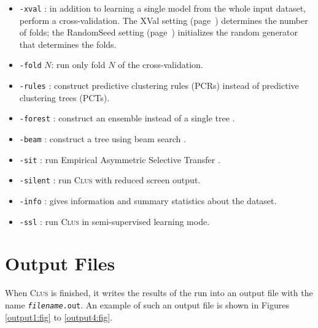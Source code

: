 \documentclass[a4paper]{report}
\newcommand{\clus}{\textsc{Clus}}
\begin{document}
\begin{itemize}
\item {\tt -xval} : in addition to learning a single model from the whole input dataset, perform a cross-validation.  The XVal setting (page~\pageref{sett:xval}) determines the number of folds; the RandomSeed setting (page~\pageref{sett:seed}) initializes the random generator that determines the folds.

\item {\tt -fold} $N$: run only fold $N$ of the cross-validation.

\item {\tt -rules} : construct predictive clustering rules (PCRs) instead of predictive clustering trees (PCTs).

\item {\tt -forest} : construct an ensemble instead of a single tree \cite{Kocev07b:proc}.

\item {\tt -beam} : construct a tree using beam search \cite{Kocev07a:proc}.

\item {\tt -sit} : run Empirical Asymmetric Selective Transfer \cite{Piccart08-DS:proc}.

\item {\tt -silent} : run \clus{} with reduced screen output.

\item {\tt -info} : gives information and summary statistics about the dataset.

\item {\tt -ssl} : run \clus{} in semi-supervised learning mode.
\end{itemize}


\chapter{Output Files}
\label{ch:output}

When \clus{} is finished, it writes the results of the run into an output file with the name
{\tt {\em filename}.out}.  An example of such an output file is shown in Figures \ref{output1:fig} to \ref{output4:fig}.
\end{document}
